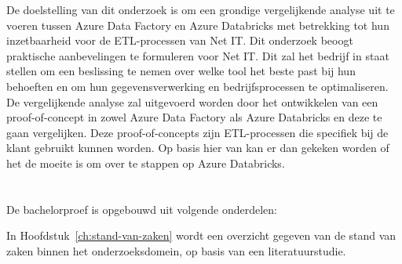 De doelstelling van dit onderzoek is om een grondige vergelijkende analyse uit te voeren tussen Azure Data Factory en Azure Databricks met betrekking tot hun inzetbaarheid voor de ETL-processen van Net IT. Dit onderzoek beoogt praktische aanbevelingen te formuleren voor Net IT. Dit zal het bedrijf in staat stellen om een beslissing te nemen over welke tool het beste past bij hun behoeften en om hun gegevensverwerking en bedrijfsprocessen te optimaliseren. De vergelijkende analyse zal uitgevoerd worden door het ontwikkelen van een proof-of-concept in zowel Azure Data Factory als Azure Databricks en deze te gaan vergelijken. Deze proof-of-concepts zijn ETL-processen die specifiek bij de klant gebruikt kunnen worden. Op basis hier van kan er dan gekeken worden of het de moeite is om over te stappen op Azure Databricks. 


\section{}%
\label{sec:opzet-bachelorproef}


%
%
%
%

De bachelorproef is opgebouwd uit volgende onderdelen:

In Hoofdstuk~\ref{ch:stand-van-zaken} wordt een overzicht gegeven van de stand van zaken binnen het onderzoeksdomein, op basis van een literatuurstudie.

